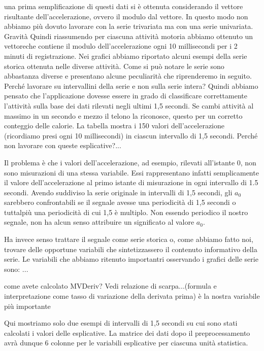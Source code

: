 %
una prima semplificazione di questi dati si è ottenuta considerando il vettore risultante dell\rq{}accelerazione, ovvero il modulo dal vettore. In questo modo non abbiamo più dovuto lavorare con la serie trivariata ma con una serie univariata.
Gravità
Quindi riassumendo per ciascuna attività motoria abbiamo ottenuto un vettoreche contiene il modulo dell\rq{}accelerazione ogni 10 millisecondi per i 2 minuti di registrazione.
Nei grafici abbiamo riportato alcuni esempi della serie storica ottenuta nelle diverse attività. Come si può notare le serie sono abbastanza diverse e presentano alcune peculiarità che riprenderemo in seguito.
%
Perché lavorare su intervallini della serie e non sulla serie intera? Quindi abbiamo pensato che l\rq{}applicazione dovesse essere in grado di classificare correttamente l\rq{}attività sulla base dei dati rilevati negli ultimi 1,5 secondi. Se cambi attività al massimo in un secondo e mezzo il telono la riconosce, questo per un corretto conteggio delle calorie. 
La tabella mostra i 150 valori dell\rq{}accelerazione (ricordiamo presi ogni 10 millisecondi) in ciascun intervallo di 1,5 secondi. Perché non lavorare con queste esplicative?...
%

%
Il problema è che i valori dell\rq{}accelerazione, ad esempio, rilevati all\rq{}istante 0, non sono misurazioni di una stessa variabile. Essi rappresentano infatti semplicamente il valore dell\rq{}accelerazione al primo istante di misurazione in ogni intervallo di 1.5 secondi. Avendo suddiviso la serie originale  in intervalli di 1,5 secondi, gli $a_0$ sarebbero confrontabili se il segnale avesse una periodicità di 1,5 secondi o tuttalpiù una periodicità di cui 1,5 è multiplo. Non essendo periodico il nostro segnale, non ha alcun senso attribuire un significato al valore $a_0$. 
%

%
Ha invece senso trattare il segnale come serie storica o, come abbiamo fatto noi, trovare delle opportune variabili che sintetizzassero il contenuto informativo della serie. Le variabili che abbiamo ritenuto importantri osservando i grafici delle serie sono: ...
%

come avete calcolato MVDeriv?
Vedi relazione di scarpa...(formula e interpretazione come tasso di variazione della derivata prima)
è la nostra variabile più importante
%

%
Qui mostriamo solo due esempi di intervalli di 1,5 secondi su cui sono stati calcolati i valori delle esplicative. La matrice dei dati dopo il preprocessamento avrà dunque 6 colonne per le variabili esplicative per ciascuna unità statistica.
%

